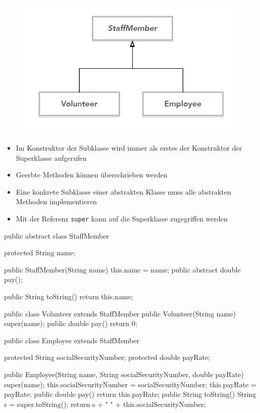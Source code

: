 \documentclass[a4paper,10pt, dvipsnames]{report}
\newcommand{\javaInLine}[1]{\texttt{#1}}
\begin{document}
\begin{figure}
    \centering
    \includegraphics[width=0.5\linewidth]{resources/Vererbung.png}
\end{figure}


\begin{itemize}
	\item Im Konstruktor der Subklasse wird immer als erstes der Konstruktor der Superklasse aufgerufen
	\item Geerbte Methoden können überschrieben werden
	\item Eine konkrete Subklasse einer abstrakten Klasse muss alle abstrakten Methoden implementieren
	\item Mit der Referenz \javaInLine{super} kann auf die Superklasse zugegriffen werden
\end{itemize}

\scriptsize
\begin{minipage}{0.48\linewidth}
\begin{javacodebox}
public abstract class StaffMember {

    protected String name;

    public StaffMember(String name) {
        this.name = name;
    }
    public abstract double pay();

    public String toString() {
        return this.name;
    }
}
\end{javacodebox}

\begin{javacodebox}
public class Volunteer extends StaffMember {
    public Volunteer(String name) {
        super(name);
    }
    public double pay() {
        return 0;
    }
}
\end{javacodebox}
\end{minipage}
\hfill
\begin{minipage}{0.48\linewidth}
\begin{javacodebox}
public class Employee extends StaffMember {

    protected String socialSecurityNumber;
    protected double payRate;

    public Employee(String name,
            String socialSecurityNumber,
            double payRate) {
        super(name);
        this.socialSecurityNumber = socialSecurityNumber;
        this.payRate = payRate;
    }
    public double pay() {
        return this.payRate;
    }
    public String toString() {
        String s = super.toString();
        return s + " " + this.socialSecurityNumber;
    }
}
\end{javacodebox}
\end{minipage}
\normalsize
\end{document}
